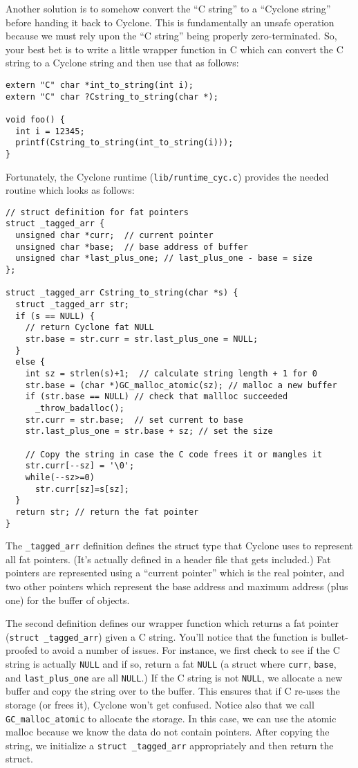 Another solution is to somehow convert the ``C string'' to a ``Cyclone
string'' before handing it back to Cyclone.  This is fundamentally
an unsafe operation because we must rely upon the ``C string'' being
properly zero-terminated.  So, your best bet is to write a little
wrapper function in C which can convert the C string to a Cyclone
string and then use that as follows:
\begin{verbatim}
extern "C" char *int_to_string(int i);
extern "C" char ?Cstring_to_string(char *);

void foo() {
  int i = 12345;
  printf(Cstring_to_string(int_to_string(i)));
}
\end{verbatim}
Fortunately, the Cyclone runtime (\texttt{lib/runtime\_cyc.c}) 
provides the needed routine which looks as follows:
\begin{verbatim}
// struct definition for fat pointers
struct _tagged_arr {
  unsigned char *curr;  // current pointer
  unsigned char *base;  // base address of buffer
  unsigned char *last_plus_one; // last_plus_one - base = size
};

struct _tagged_arr Cstring_to_string(char *s) {
  struct _tagged_arr str;
  if (s == NULL) {
    // return Cyclone fat NULL
    str.base = str.curr = str.last_plus_one = NULL;
  }
  else {
    int sz = strlen(s)+1;  // calculate string length + 1 for 0
    str.base = (char *)GC_malloc_atomic(sz); // malloc a new buffer
    if (str.base == NULL) // check that mallloc succeeded
      _throw_badalloc();
    str.curr = str.base;  // set current to base
    str.last_plus_one = str.base + sz; // set the size

    // Copy the string in case the C code frees it or mangles it
    str.curr[--sz] = '\0';
    while(--sz>=0)
      str.curr[sz]=s[sz];
  }
  return str; // return the fat pointer
}
\end{verbatim}
The \texttt{\_tagged\_arr} definition defines the struct type that
Cyclone uses to represent all fat pointers.  (It's actually defined
in a header file that gets included.)  Fat pointers are represented
using a ``current pointer'' which is the real pointer, and two
other pointers which represent the base address and maximum address
(plus one) for the buffer of objects.  

The second definition defines our wrapper function which returns a fat
pointer (\texttt{struct \_tagged\_arr}) given a C string.  You'll
notice that the function is bullet-proofed to avoid a number of
issues.  For instance, we first check to see if the C string is
actually \texttt{NULL} and if so, return a fat \texttt{NULL} 
(a struct where \texttt{curr}, \texttt{base}, and \texttt{last\_plus\_one}
are all \texttt{NULL}.)  If the C string is not \texttt{NULL},
we allocate a new buffer and copy the string over to the buffer.
This ensures that if C re-uses the storage (or frees it), Cyclone
won't get confused.  Notice also that we call \texttt{GC\_malloc\_atomic}
to allocate the storage.  In this case, we can use the atomic
malloc because we know the data do not contain pointers.
After copying the string, we initialize a \texttt{struct \_tagged\_arr}
appropriately and then return the struct.  

